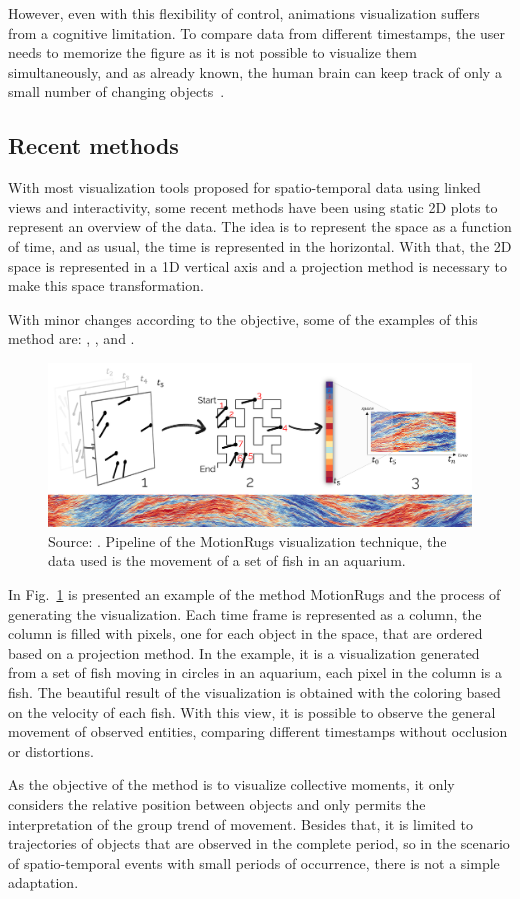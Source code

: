 However, even with this flexibility of control, animations visualization suffers from a cognitive limitation.
%
To compare data from different timestamps, the user needs to memorize the figure as it is not possible to visualize them simultaneously, and as already known, the human brain can keep track of only a small number of changing objects~\cite{Harrower:2007:Cognitive}. 
%
\subsection{Recent methods}
%
With most visualization tools proposed for spatio-temporal data using linked views and interactivity, some recent methods have been using static 2D plots to represent an overview of the data.
%
The idea is to represent the space as a function of time, and as usual, the time is represented in the horizontal.
%
With that, the 2D space is represented in a 1D vertical axis and a projection method is necessary to make this space transformation.

With minor changes according to the objective, some of the examples of this method are: \cite{Buchmuller:2018:MVCTST}, \cite{spatialrugs}, \cite{wulms2021stable} and \cite{1dordering}.

\begin{figure}
    \centering
    \includegraphics[width = \textwidth]{src/imgs/motionrugs.png}
    \caption{Source: \cite{Buchmuller:2018:MVCTST}. Pipeline of the MotionRugs visualization technique, the data used is the movement of a set of fish in an aquarium.}
    \label{fig:motionrugs}
\end{figure}

In Fig.~\ref{fig:motionrugs} is presented an example of the method MotionRugs and the process of generating the visualization.
%
Each time frame is represented as a column, the column is filled with pixels, one for each object in the space, that are ordered based on a projection method.
%
In the example, it is a visualization generated from a set of fish moving in circles in an aquarium, each pixel in the column is a fish. 
%
The beautiful result of the visualization is obtained with the coloring based on the velocity of each fish.
%
With this view, it is possible to observe the general movement of observed entities, comparing different timestamps without occlusion or distortions.

%
As the objective of the method is to visualize collective moments, it only considers the relative position between objects and only permits the interpretation of the group trend of movement.
%
Besides that, it is limited to trajectories of objects that are observed in the complete period, so in the scenario of spatio-temporal events with small periods of occurrence, there is not a simple adaptation.
